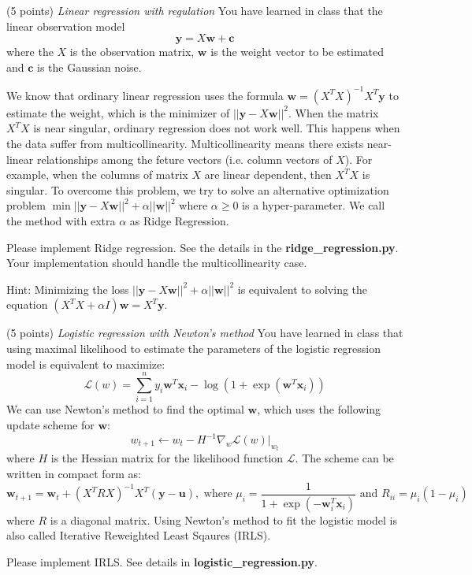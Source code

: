 \documentclass[a4paper, 12pt]{exam}
\begin{document}
\begin{questions}
\question (5 points) \emph{Linear regression with regulation} You have learned in class that the linear observation model
\begin{equation*}
\bm{y} = X\bm{w} + \bm{c}
\end{equation*}
where the $X$ is the observation matrix,
$\bm{w}$ is the weight vector to be estimated and $\bm{c}$ is the Gaussian noise.

We know that ordinary linear regression uses the formula $\bm{w} = (X^TX)^{-1}X^T\bm{y}$ to estimate the weight, which is the minimizer
of $||\bm{y} - X\bm{w}||^2$.
When the matrix $X^TX$ is near singular, ordinary regression does not work well. This happens when
the data suffer from multicollinearity. Multicollinearity means there exists near-linear relationships among the feture vectors (i.e. column vectors of $X$).
For example, when the columns of matrix $X$ are linear dependent, then $X^TX$ is singular. To overcome this problem, we try to solve an alternative optimization problem
$\min ||\bm{y} - X\bm{w}||^2 + \alpha ||\bm{w}||^2$ where $\alpha \geq 0$ is a hyper-parameter. We call the method with extra $\alpha$ as Ridge Regression.

Please implement Ridge regression. See the details in the \textbf{ridge\_regression.py}.
Your implementation should handle the multicollinearity case.

Hint: Minimizing the loss $||\bm{y} - X\bm{w}||^2 + \alpha ||\bm{w}||^2$ is equivalent to solving the equation
$( X^T X+ \alpha I)\bm{w}  = X^T \bm{y}$.

\question (5 points) \emph{Logistic regression with Newton's method} You have learned in class that using maximal likelihood to estimate the parameters of the logistic regression model is equivalent to maximize:
\begin{equation*}
\mathcal{L}(w) = \sum_{i=1}^n y_i \bm{w}^T \bm{x}_i - \log ( 1 + \exp(\bm{w}^T \bm{x}_i))
\end{equation*}
We can use Newton's method to find the optimal $\bm{w}$, which uses the following update scheme for $\bm{w}$:
\begin{equation*}
w_{t+1} \leftarrow w_t - H^{-1} \nabla_w \mathcal{L}(w)|_{w_t}
\end{equation*}
where $H$ is the Hessian matrix for the likelihood function $\mathcal{L}$.
The scheme can be written in compact form as:
\begin{equation*}
\bm{w}_{t+1} = \bm{w}_t + (X^TRX)^{-1} X^T(\bm{y}-\bm{u}), \textrm{ where } \mu_i = \frac{1}{1+\exp(-\bm{w}_i^T\bm{x}_i)} \textrm{ and } R_{ii} = \mu_i ( 1 - \mu_i)
\end{equation*}
where $R$ is a diagonal matrix. Using Newton's method to fit the logistic model is also called Iterative Reweighted Least Sqaures (IRLS).

Please implement IRLS. See details in \textbf{logistic\_regression.py}.

\end{questions}
\end{document}
